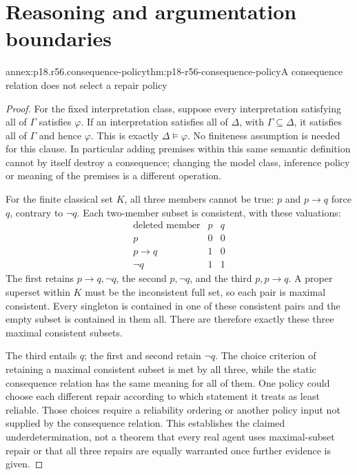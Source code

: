 \section{Reasoning and argumentation boundaries}
\label{sec:p18-r56-proofs}

\begin{annexitem}{annex:p18.r56.consequence-policy}{thm:p18-r56-consequence-policy}{A consequence relation does not select a repair policy}
\begin{proof}
For the fixed interpretation class, suppose every interpretation
satisfying all of \(\Gamma\) satisfies \(\varphi\).
If an interpretation satisfies all of \(\Delta\), with
\(\Gamma\subseteq\Delta\), it satisfies all of \(\Gamma\)
and hence \(\varphi\). This is exactly
\(\Delta\models\varphi\). No finiteness assumption is needed for
this clause. In particular adding premises within this same semantic
definition cannot by itself destroy a consequence; changing the
model class, inference policy or meaning of the premises is a
different operation.

For the finite classical set \(K\), all three members cannot be
true: \(p\) and \(p\to q\) force \(q\), contrary to \(\neg q\).
Each two-member subset is consistent, with these valuations:
\[
\begin{array}{c|cc}
\text{deleted member}&p&q\\\hline
p&0&0\\
p\to q&1&0\\
\neg q&1&1
\end{array}
\]
The first retains \(p\to q,\neg q\), the second \(p,\neg q\),
and the third \(p,p\to q\). A proper superset within \(K\)
must be the inconsistent full set, so each pair is maximal consistent.
Every singleton is contained in one of these consistent pairs and
the empty subset is contained in them all. There are therefore exactly
these three maximal consistent subsets.

The third entails \(q\); the first and second retain \(\neg q\).
The choice criterion of retaining a maximal consistent subset is
met by all three, while the static consequence relation has the
same meaning for all of them. One policy could choose each different
repair according to which statement it treats as least reliable.
Those choices require a reliability ordering or another policy input
not supplied by the consequence relation. This establishes the
claimed underdetermination, not a theorem that every real agent
uses maximal-subset repair or that all three repairs are equally
warranted once further evidence is given.
\end{proof}
\end{annexitem}

